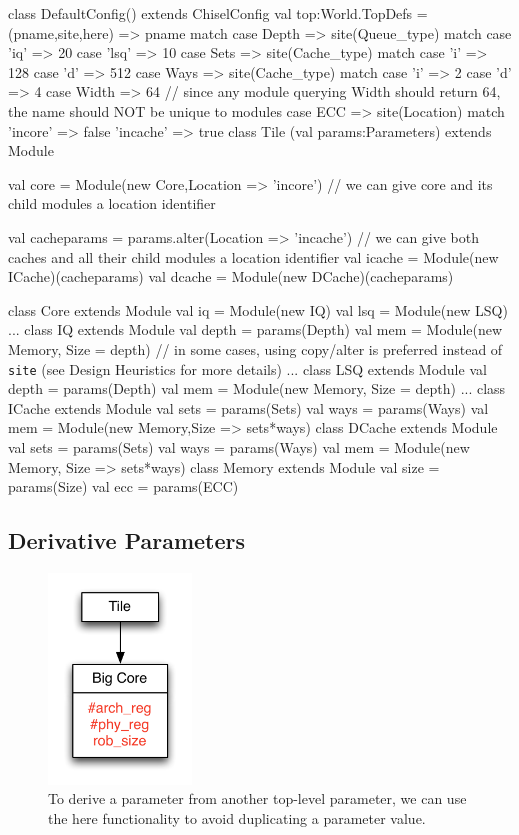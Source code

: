 \documentclass[10pt,twocolumn]{article}
\def\code#1{{\small\tt #1}}
\begin{document}
\begin{scala}
class DefaultConfig() extends ChiselConfig {
  val top:World.TopDefs = {
    (pname,site,here) => pname match {
      case Depth => site(Queue_type) match {
        case 'iq' => 20
        case 'lsq' => 10
      }
      case Sets => site(Cache_type) match {
        case 'i' => 128
        case 'd' => 512
      }
      case Ways => site(Cache_type) match {
        case 'i' => 2
        case 'd' => 4
      }
      case Width => 64
      // since any module querying Width should return 64, the name should NOT be unique to modules
      case ECC => site(Location) match {
        'incore' => false
        'incache' => true
      }
    }
  }
}
class Tile (val params:Parameters) extends Module { 
  val core = Module(new Core,{Location => 'incore'})
  // we can give core and its child modules a location identifier
  
  val cacheparams = params.alter({Location => 'incache'})
  // we can give both caches and all their child modules a location identifier
  val icache = Module(new ICache)(cacheparams)
  val dcache = Module(new DCache)(cacheparams)
}
class Core extends Module {
  val iq = Module(new IQ)
  val lsq = Module(new LSQ)
  ...
}
class IQ extends Module {
  val depth = params(Depth)
  val mem = Module(new Memory, {Size = depth})
  // in some cases, using copy/alter is preferred instead of \code{site} (see Design Heuristics for more details)
  ...
}
class LSQ extends Module {
  val depth = params(Depth)
  val mem = Module(new Memory, {Size = depth})
  ...
}
class ICache extends Module {
  val sets = params(Sets)
  val ways = params(Ways)
  val mem = Module(new Memory,{Size => sets*ways})
}
class DCache extends Module {
  val sets = params(Sets)
  val ways = params(Ways)
  val mem = Module(new Memory, {Size => sets*ways})
}
class Memory extends Module {
  val size = params(Size)
  val ecc = params(ECC)
}
\end{scala}

\subsection{Derivative Parameters}

\begin{figure}[h]
\centering
\includegraphics[width=1.5in]{figs/ex5}
\caption{To derive a parameter from another top-level parameter, we can use the here functionality to avoid duplicating a parameter value.}
\label{fig:ex5}
\end{figure}
\end{document}

